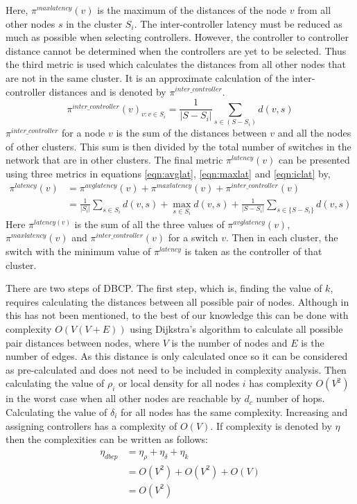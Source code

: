 \documentclass[times]{dacauth}
\begin{document}
Here, $\pi^{maxlatency}(v)$ is the maximum of the distances of the node $v$ from all other nodes $s$ in the cluster $S_i$.
The inter-controller latency must be reduced as much as possible when selecting controllers. However, the controller to controller distance cannot be determined when the controllers are yet to be selected. Thus the third metric is used which calculates the distances from all other nodes that are not in the same cluster. It is an approximate calculation of the inter-controller distances and is denoted by $\pi^{inter\_controller}$.
\begin{equation}	\label{eqn:iclat}
\pi^{inter\_controller}(v)_{v:v\in S_i} = \frac{1}{|S-S_i|} \sum_{s\in (S-S_i)}d(v,s)
\end{equation}
$\pi^{inter\_controller}$ for a node $v$ is the sum of the distances between $v$ and all the nodes of other clusters. This sum is then divided by the total number of switches in the network that are in other clusters.
The final metric $\pi^{latency}(v)$ can be presented using three metrics in equations \ref{eqn:avglat}, \ref{eqn:maxlat} and \ref{eqn:iclat} by,
\begin{equation}	\label{eqn:totlat}
\begin{split}
\pi^{latency}(v) & = \pi^{avglatency}(v) + \pi^{maxlatency}(v) + \pi^{inter\_controller}(v)\\
& =\frac{1}{|S_i|} \sum_{s\in S_i}d(v,s) + \max_{s\in S_i}d(v,s) + \frac{1}{|S-S_i|} \sum_{s\in \{S-S_i\}}d(v,s)
\end{split}
\end{equation}
Here $\pi^{latency(v)}$ is the sum of all the three values of $\pi^{avglatency}(v)$, $\pi^{maxlatency}(v)$ and $\pi^{inter\_controller}(v)$ for a switch $v$. Then in each cluster, the switch with the minimum value of $\pi^{latency}$ is taken as the controller of that cluster.

\smallskip
There are two steps of DBCP. The first step, which is, finding the value of $k$, requires calculating the distances between all possible pair of nodes. Although in \cite{dbcp2017} this has not been mentioned, to the best of our knowledge this can be done with complexity $O(V(V+E))$ using Dijkstra's algorithm to calculate all possible pair distances between nodes, where $V$ is the number of nodes and $E$ is the number of edges. As this distance is only calculated once so it can be considered as pre-calculated and does not need to be included in complexity analysis.
Then calculating the value of $\rho_i$ or local density for all nodes $i$ has complexity $O(V^2)$ in the worst case when all other nodes are reachable by $d_c$ number of hops. Calculating the value of $\delta_i$ for all nodes has the same complexity. Increasing and assigning controllers has a complexity of $O(V)$. If complexity is denoted by $\eta$ then the complexities can be written as follows:
\begin{equation}
\begin{split}
\eta_{dbcp} 
& = \eta_{\rho} + \eta_{\delta} + \eta_{k}\\
& =O(V^2) + O(V^2) + O(V)\\
& =O(V^2) \\
\end{split}
\end{equation}
\end{document}
